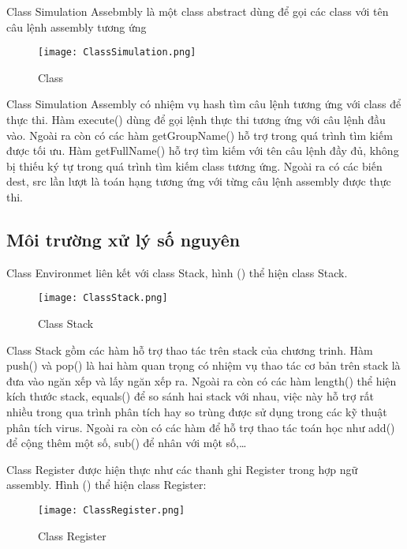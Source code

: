 	\newpage
	Class Simulation Assebmbly là một class abstract dùng để gọi các class với tên câu lệnh assembly tương ứng	
	\begin{center}
			\begin{figure}[htp]
				\begin{center}
					\texttt{[image: ClassSimulation.png]}
				\end{center}
				\caption{Class}	
					\label{fig:}		
			\end{figure}
		\end{center}				
		
		Class Simulation Assembly có nhiệm vụ hash tìm câu lệnh tương ứng với class để thực thi. Hàm execute() dùng để gọi lệnh thực thi tương ứng với câu lệnh đầu vào. Ngoài ra còn có các hàm getGroupName() hỗ trợ trong quá trình tìm kiếm được tối ưu. Hàm getFullName() hỗ trợ tìm kiếm với tên câu lệnh đầy đủ, không bị thiếu ký tự trong quá trình tìm kiếm class tương ứng. Ngoài ra có các biến dest, src lần lượt là toán hạng tương ứng với từng câu lệnh assembly được thực thi. 
		
		\newpage
	\subsection*{Môi trường xử lý số nguyên}
	Class Environmet liên kết với class Stack, hình () thể hiện class Stack.
		\begin{center}
			\begin{figure}[htp]
				\begin{center}
					\texttt{[image: ClassStack.png]}
				\end{center}
				\caption{Class Stack}	
					\label{fig:ClassStack}		
			\end{figure}
		\end{center}		
	
	Class Stack gồm các hàm hỗ trợ thao tác trên stack của chương trinh. Hàm push() và pop() là hai hàm quan trọng có nhiệm vụ thao tác cơ bản trên stack là đưa vào ngăn xếp và lấy ngăn xếp ra. Ngoài ra còn có các hàm length() thể hiện kích thước stack, equals() để so sánh hai stack với nhau, việc này hỗ trợ rất nhiều trong qua trình phân tích hay so trùng được sử dụng trong các kỹ thuật phân tích virus. Ngoài ra còn có các hàm để hỗ trợ thao tác toán học như add() để cộng thêm một số, sub() để nhân với một số,…
			
		\newpage
		Class Register được hiện thực như các thanh ghi Register trong hợp ngữ assembly. Hình () thể hiện class Register:
		\begin{center}
			\begin{figure}[htp]
				\begin{center}
					\texttt{[image: ClassRegister.png]}
				\end{center}
				\caption{Class Register}	
					\label{fig:ClassRegister}		
			\end{figure}
		\end{center}		
			
